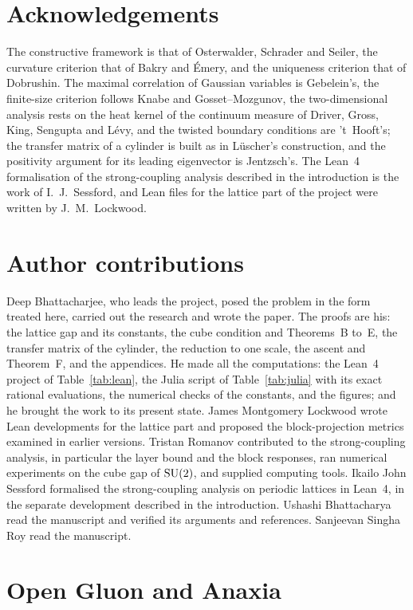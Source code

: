 \section*{Acknowledgements}

The constructive framework is that of Osterwalder, Schrader and Seiler, the
curvature criterion that of Bakry and \'Emery, and the uniqueness criterion
that of Dobrushin. The maximal correlation of Gaussian variables is
Gebelein's, the finite-size criterion follows Knabe and Gosset--Mozgunov, the
two-dimensional analysis rests on the heat kernel of the continuum measure of
Driver, Gross, King, Sengupta and L\'evy, and the twisted boundary conditions
are 't~Hooft's; the transfer matrix of a cylinder is built as in L\"uscher's
construction, and the positivity argument for its leading eigenvector is
Jentzsch's. The Lean~4 formalisation of the strong-coupling analysis
described in the introduction is the work of I.~J.~Sessford, and Lean files
for the lattice part of the project were written by J.~M.~Lockwood.

\section*{Author contributions}

Deep Bhattacharjee, who leads the project, posed the problem in the form
treated here, carried out the research and wrote the paper. The proofs are
his: the lattice gap and its constants, the cube condition and Theorems~B
to~E, the transfer matrix of the cylinder, the reduction to one scale, the
ascent and Theorem~F, and the appendices. He made all the computations: the
Lean~4 project of Table~\ref{tab:lean}, the Julia script of
Table~\ref{tab:julia} with its exact rational evaluations, the
numerical checks of the constants, and the figures; and he brought the work
to its present state. James Montgomery Lockwood wrote Lean developments for
the lattice part and proposed the block-projection metrics examined in
earlier versions. Tristan Romanov contributed to the strong-coupling
analysis, in particular the layer bound and the block responses, ran
numerical experiments on the cube gap of $\mathrm{SU}(2)$, and supplied computing
tools. Ikailo John Sessford formalised the strong-coupling analysis on
periodic lattices in Lean~4, in the separate development described in the
introduction. Ushashi Bhattacharya read the manuscript and verified its
arguments and references. Sanjeevan Singha Roy read the manuscript.

\section*{Open Gluon and Anaxia}

